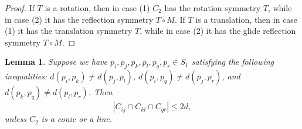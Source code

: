 \documentclass[12pt]{article}
\newtheorem{lemma}[theorem]{Lemma}
\begin{document}
\begin{proof}
 If $T$ is a rotation, then in case (1) $C_2$ has the rotation symmetry $T$,
 while in case (2) it has the reflection symmetry $T\circ M$.
 If $T$ is a translation, then in case (1) it has the translation symmetry $T$,
 while in case (2) it has the glide reflection symmetry $T\circ M$.
\end{proof}
  

\begin{lemma}\label{lem:diffdist}
 Suppose we have $p_i,p_j,p_k,p_l,p_q,p_r\in S_1$ satisfying the following inequalities:
 $d(p_i, p_k) \neq d(p_j, p_l)$, 
 $d(p_i, p_q) \neq d(p_j, p_r)$, and 
 $d(p_k, p_q) \neq d(p_l, p_r)$.
 Then
 $$|C_{ij}\cap C_{kl} \cap C_{qr}| \leq 2d,$$
 unless $C_2$ is a conic or a line.
\end{lemma}
\end{document}
